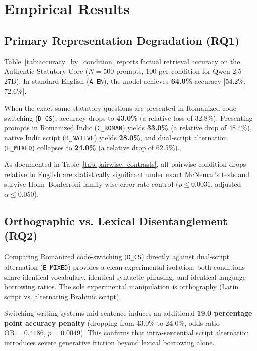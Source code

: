 \documentclass[11pt]{article}
\begin{document}
\section{Empirical Results}
\label{sec:results}



\subsection{Primary Representation Degradation (RQ1)}
Table~\ref{tab:accuracy_by_condition} reports factual retrieval accuracy on the Authentic Statutory Core ($N=500$ prompts, 100 per condition for Qwen-2.5-27B). In standard English (\texttt{A\_EN}), the model achieves \textbf{64.0\%} accuracy [54.2\%, 72.6\%]. 

When the exact same statutory questions are presented in Romanized code-switching (\texttt{D\_CS}), accuracy drops to \textbf{43.0\%} (a relative loss of 32.8\%). Presenting prompts in Romanized Indic (\texttt{C\_ROMAN}) yields \textbf{33.0\%} (a relative drop of 48.4\%), native Indic script (\texttt{B\_NATIVE}) yields \textbf{28.0\%}, and dual-script alternation (\texttt{E\_MIXED}) collapses to \textbf{24.0\%} (a relative drop of 62.5\%).



As documented in Table~\ref{tab:pairwise_contrasts}, all pairwise condition drops relative to English are statistically significant under exact McNemar's tests and survive Holm--Bonferroni family-wise error rate control \citep{holm1979simple} ($p \le 0.0031$, adjusted $\alpha \le 0.050$).

\subsection{Orthographic vs. Lexical Disentanglement (RQ2)}
Comparing Romanized code-switching (\texttt{D\_CS}) directly against dual-script alternation (\texttt{E\_MIXED}) provides a clean experimental isolation: both conditions share identical vocabulary, identical syntactic phrasing, and identical language borrowing ratios. The sole experimental manipulation is orthography (Latin script vs. alternating Brahmic script).

Switching writing systems mid-sentence induces an additional \textbf{19.0 percentage point accuracy penalty} (dropping from 43.0\% to 24.0\%, odds ratio $\text{OR} = 0.4186$, $p = 0.0049$). This confirms that intra-sentential script alternation introduces severe generative friction beyond lexical borrowing alone.
\end{document}
